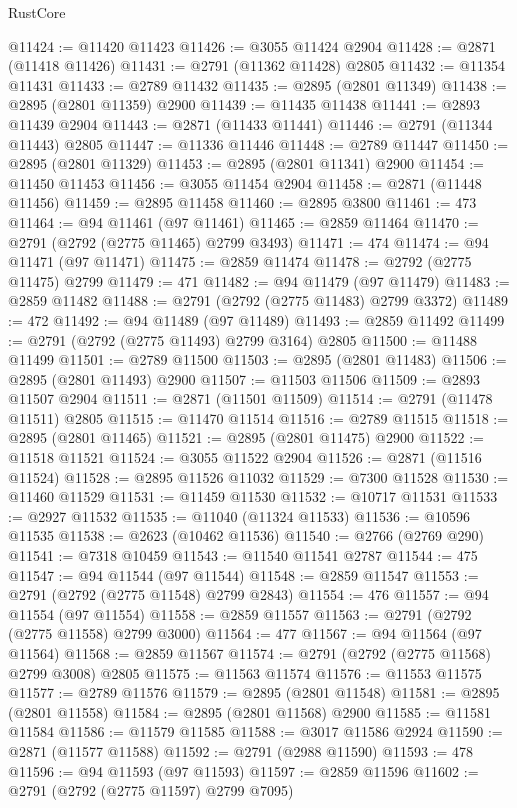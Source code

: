 \begin{lexlean}{RustCore}
\begin{coremodule}
@11424 := @11420 @11423
@11426 := @3055 @11424 @2904
@11428 := @2871 (@11418 @11426)
@11431 := @2791 (@11362 @11428) @2805
@11432 := @11354 @11431
@11433 := @2789 @11432
@11435 := @2895 (@2801 @11349)
@11438 := @2895 (@2801 @11359) @2900
@11439 := @11435 @11438
@11441 := @2893 @11439 @2904
@11443 := @2871 (@11433 @11441)
@11446 := @2791 (@11344 @11443) @2805
@11447 := @11336 @11446
@11448 := @2789 @11447
@11450 := @2895 (@2801 @11329)
@11453 := @2895 (@2801 @11341) @2900
@11454 := @11450 @11453
@11456 := @3055 @11454 @2904
@11458 := @2871 (@11448 @11456)
@11459 := @2895 @11458
@11460 := @2895 @3800
@11461 := 473
@11464 := @94 @11461 (@97 @11461)
@11465 := @2859 @11464
@11470 := @2791 (@2792 (@2775 @11465) @2799 @3493)
@11471 := 474
@11474 := @94 @11471 (@97 @11471)
@11475 := @2859 @11474
@11478 := @2792 (@2775 @11475) @2799
@11479 := 471
@11482 := @94 @11479 (@97 @11479)
@11483 := @2859 @11482
@11488 := @2791 (@2792 (@2775 @11483) @2799 @3372)
@11489 := 472
@11492 := @94 @11489 (@97 @11489)
@11493 := @2859 @11492
@11499 := @2791 (@2792 (@2775 @11493) @2799 @3164) @2805
@11500 := @11488 @11499
@11501 := @2789 @11500
@11503 := @2895 (@2801 @11483)
@11506 := @2895 (@2801 @11493) @2900
@11507 := @11503 @11506
@11509 := @2893 @11507 @2904
@11511 := @2871 (@11501 @11509)
@11514 := @2791 (@11478 @11511) @2805
@11515 := @11470 @11514
@11516 := @2789 @11515
@11518 := @2895 (@2801 @11465)
@11521 := @2895 (@2801 @11475) @2900
@11522 := @11518 @11521
@11524 := @3055 @11522 @2904
@11526 := @2871 (@11516 @11524)
@11528 := @2895 @11526 @11032
@11529 := @7300 @11528
@11530 := @11460 @11529
@11531 := @11459 @11530
@11532 := @10717 @11531
@11533 := @2927 @11532
@11535 := @11040 (@11324 @11533)
@11536 := @10596 @11535
@11538 := @2623 (@10462 @11536)
@11540 := @2766 (@2769 @290)
@11541 := @7318 @10459
@11543 := @11540 @11541 @2787
@11544 := 475
@11547 := @94 @11544 (@97 @11544)
@11548 := @2859 @11547
@11553 := @2791 (@2792 (@2775 @11548) @2799 @2843)
@11554 := 476
@11557 := @94 @11554 (@97 @11554)
@11558 := @2859 @11557
@11563 := @2791 (@2792 (@2775 @11558) @2799 @3000)
@11564 := 477
@11567 := @94 @11564 (@97 @11564)
@11568 := @2859 @11567
@11574 := @2791 (@2792 (@2775 @11568) @2799 @3008) @2805
@11575 := @11563 @11574
@11576 := @11553 @11575
@11577 := @2789 @11576
@11579 := @2895 (@2801 @11548)
@11581 := @2895 (@2801 @11558)
@11584 := @2895 (@2801 @11568) @2900
@11585 := @11581 @11584
@11586 := @11579 @11585
@11588 := @3017 @11586 @2924
@11590 := @2871 (@11577 @11588)
@11592 := @2791 (@2988 @11590)
@11593 := 478
@11596 := @94 @11593 (@97 @11593)
@11597 := @2859 @11596
@11602 := @2791 (@2792 (@2775 @11597) @2799 @7095)

\end{coremodule}
\end{lexlean}
